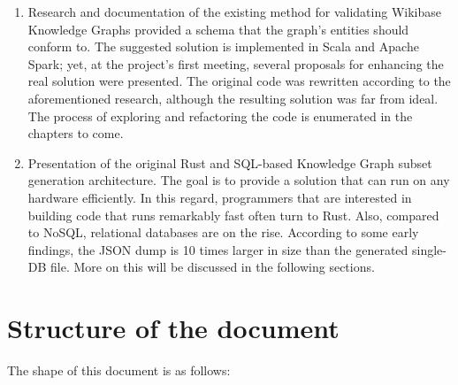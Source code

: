 \begin{enumerate}
    \item Research and documentation of the existing method for validating Wikibase Knowledge Graphs provided a schema that the graph's entities should conform to. The suggested solution is implemented in Scala and Apache Spark; yet, at the project's first meeting, several proposals for enhancing the real solution were presented. The original code was rewritten according to the aforementioned research, although the resulting solution was far from ideal. The process of exploring and refactoring the code is enumerated in the chapters to come.\\

    \item Presentation of the original Rust and SQL-based Knowledge Graph subset generation architecture. The goal is to provide a solution that can run on any hardware efficiently. In this regard, programmers that are interested in building code that runs remarkably fast often turn to Rust. Also, compared to NoSQL, relational databases are on the rise. According to some early findings, the JSON dump is 10 times larger in size than the generated single-DB file. More on this will be discussed in the following sections.
\end{enumerate}

\section{Structure of the document}

The shape of this document is as follows:

